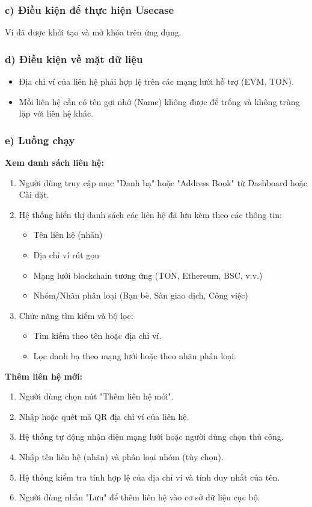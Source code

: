 \documentclass[a4paper]{report}
\begin{document}
\subsubsection{c) Điều kiện để thực hiện Usecase}
Ví đã được khởi tạo và mở khóa trên ứng dụng.

\subsubsection{d) Điều kiện về mặt dữ liệu}
\begin{itemize}
    \item Địa chỉ ví của liên hệ phải hợp lệ trên các mạng lưới hỗ trợ (EVM, TON).
    \item Mỗi liên hệ cần có tên gợi nhớ (Name) không được để trống và không trùng lặp với liên hệ khác.
\end{itemize}

\subsubsection{e) Luồng chạy}
\textbf{Xem danh sách liên hệ:}
\begin{enumerate}
    \item Người dùng truy cập mục "Danh bạ" hoặc "Address Book" từ Dashboard hoặc Cài đặt.
    \item Hệ thống hiển thị danh sách các liên hệ đã lưu kèm theo các thông tin:
    \begin{itemize}
        \item Tên liên hệ (nhãn)
        \item Địa chỉ ví rút gọn
        \item Mạng lưới blockchain tương ứng (TON, Ethereum, BSC, v.v.)
        \item Nhóm/Nhãn phân loại (Bạn bè, Sàn giao dịch, Công việc)
    \end{itemize}
    \item Chức năng tìm kiếm và bộ lọc:
    \begin{itemize}
        \item Tìm kiếm theo tên hoặc địa chỉ ví.
        \item Lọc danh bạ theo mạng lưới hoặc theo nhãn phân loại.
    \end{itemize}
\end{enumerate}

\textbf{Thêm liên hệ mới:}
\begin{enumerate}
    \item Người dùng chọn nút "Thêm liên hệ mới".
    \item Nhập hoặc quét mã QR địa chỉ ví của liên hệ.
    \item Hệ thống tự động nhận diện mạng lưới hoặc người dùng chọn thủ công.
    \item Nhập tên liên hệ (nhãn) và phân loại nhóm (tùy chọn).
    \item Hệ thống kiểm tra tính hợp lệ của địa chỉ ví và tính duy nhất của tên.
    \item Người dùng nhấn "Lưu" để thêm liên hệ vào cơ sở dữ liệu cục bộ.
\end{enumerate}
\end{document}

